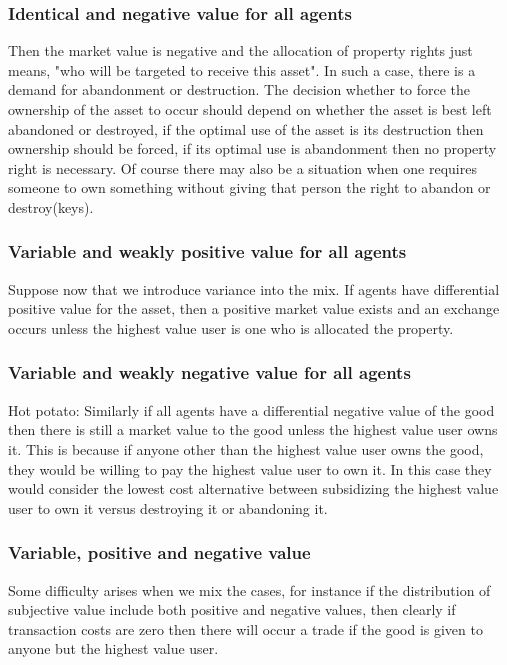 \documentclass[12pt]{article}
\numberwithin{equation}{section}
\begin{document}
\subsubsection{Identical and negative value for all agents}

Then the market value is negative and the allocation of property rights just means,  "who will be targeted to receive this asset". In such a case, there is a demand for abandonment or destruction. The decision whether to force the ownership of the asset to occur should depend on whether the asset is best left abandoned or destroyed, if the optimal use of the asset is its destruction then ownership should be forced, if its optimal use is abandonment then no property right is necessary. Of course there may also be a situation when one requires someone to own something without giving that person the right to abandon or destroy(keys).

\subsubsection{Variable and weakly positive value for all agents}

Suppose now that we introduce variance into the mix. If agents have differential positive value for the asset, then a positive market value exists and an exchange occurs unless the highest value user is one who is allocated the property.

\subsubsection{Variable and weakly negative value for all agents}

Hot potato: Similarly if all agents have a differential negative value of the good then there is still a market value to the good unless the highest value user owns it. This is because if anyone other than the highest value user owns the good, they would be willing to pay the highest value user to own it. In this case they would consider the lowest cost alternative between subsidizing the highest value user to own it versus destroying it or abandoning it.


\subsubsection{Variable, positive and negative value}

Some difficulty arises when we mix the cases, for instance if the distribution of subjective value include both positive and negative values, then clearly if transaction costs are zero then there will occur a trade if the good is given to anyone but the highest value user.
\end{document}
